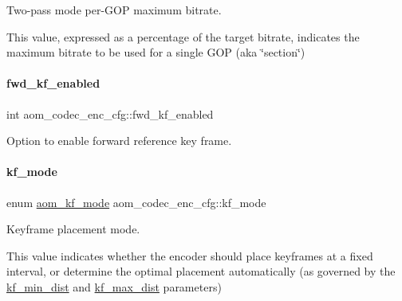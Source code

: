 Two-\/pass mode per-\/\+G\+OP maximum bitrate. 

This value, expressed as a percentage of the target bitrate, indicates the maximum bitrate to be used for a single G\+OP (aka \char`\"{}section\char`\"{}) \mbox{\label{structaom__codec__enc__cfg_aae6716f2cd78979c59f7fa39fec1717f}} 
\paragraph{\texorpdfstring{fwd\+\_\+kf\+\_\+enabled}{fwd\_kf\_enabled}}
{\footnotesize\ttfamily int aom\+\_\+codec\+\_\+enc\+\_\+cfg\+::fwd\+\_\+kf\+\_\+enabled}



Option to enable forward reference key frame. 

\mbox{\label{structaom__codec__enc__cfg_a3c1ea7f3ea90b9b8eab4c3f266ffacdc}} 
\paragraph{\texorpdfstring{kf\+\_\+mode}{kf\_mode}}
{\footnotesize\ttfamily enum \hyperlink{group__encoder_gac0498fc02cd368e6d9675cdb0bab5a84}{aom\+\_\+kf\+\_\+mode} aom\+\_\+codec\+\_\+enc\+\_\+cfg\+::kf\+\_\+mode}



Keyframe placement mode. 

This value indicates whether the encoder should place keyframes at a fixed interval, or determine the optimal placement automatically (as governed by the \hyperlink{structaom__codec__enc__cfg_a5df0104b97c8ad18f8f1df492706a256}{kf\+\_\+min\+\_\+dist} and \hyperlink{structaom__codec__enc__cfg_a877936e8a60207e7eac223811af0c124}{kf\+\_\+max\+\_\+dist} parameters) \mbox{\label{structaom__codec__enc__cfg_a5df0104b97c8ad18f8f1df492706a256}} 
